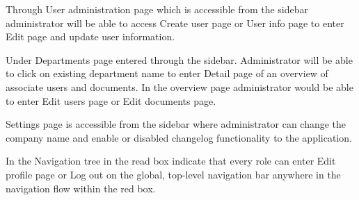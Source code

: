 Through User administration page which is accessible from the sidebar administrator will be able to access Create user page or User info page to enter Edit page and update user information.

Under Departments page entered through the sidebar.
Administrator will be able to click on existing department name to enter Detail page of an overview of associate users and documents.
In the overview page administrator would be able to enter Edit users page or Edit documents page.

Settings page is accessible from the sidebar where administrator can change the company name and enable or disabled changelog functionality to the application.

In the Navigation tree in  the read box indicate that every role can enter Edit profile page or Log out on the global, top-level navigation bar anywhere in the navigation flow within the red box.
